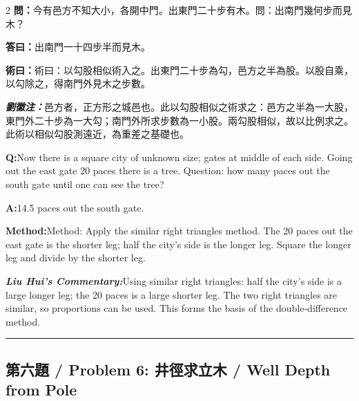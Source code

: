 \documentclass[11pt,a4paper]{article}
\newcommand{\cnwen}{\textcolor{cnlabelfg}{\textbf{問：}}}
\newcommand{\cnda}{\textbf{答曰：}}
\newcommand{\cnshu}{\textcolor{cnlabelfg}{\textbf{術曰：}}}
\newcommand{\cnzhu}{\textcolor{commentarycolor}{\textit{\textbf{劉徽注：}}}}
\newcommand{\enwen}{\textcolor{enlabelfg}{\textbf{Q:}}}
\newcommand{\enda}{\textcolor{enlabelfg}{\textbf{A:}}}
\newcommand{\enshu}{\textcolor{enlabelfg}{\textbf{Method:}}}
\newcommand{\enzhu}{\textcolor{enlabelfg}{\textit{\textbf{Liu Hui's Commentary:}}}}
\begin{document}
\begin{paracol}{2}
\switchcolumn[0]
\cnwen 今有邑方不知大小，各開中門。出東門二十步有木。問：出南門幾何步而見木？

\cnda 出南門一十四步半而見木。

\cnshu 術曰：以勾股相似術入之。出東門二十步為勾，邑方之半為股。以股自乘，以勾除之，得南門外見木之步數。

\cnzhu 邑方者，正方形之城邑也。此以勾股相似之術求之：邑方之半為一大股，東門外二十步為一大勾；南門外所求步數為一小股。兩勾股相似，故以比例求之。此術以相似勾股測遠近，為重差之基礎也。

\switchcolumn[1]
\enwen Now there is a square city of unknown size; gates at middle of each side. Going out the east gate 20 paces there is a tree. Question: how many paces out the south gate until one can see the tree?

\enda 14.5 paces out the south gate.

\enshu Method: Apply the similar right triangles method. The 20 paces out the east gate is the shorter leg; half the city's side is the longer leg. Square the longer leg and divide by the shorter leg.

\enzhu Using similar right triangles: half the city's side is a large longer leg; the 20 paces is a large shorter leg. The two right triangles are similar, so proportions can be used. This forms the basis of the double-difference method.
\end{paracol}

\bigskip\hrule\bigskip

\subsection{第六題 / Problem 6: 井徑求立木 / Well Depth from Pole}
\end{document}
